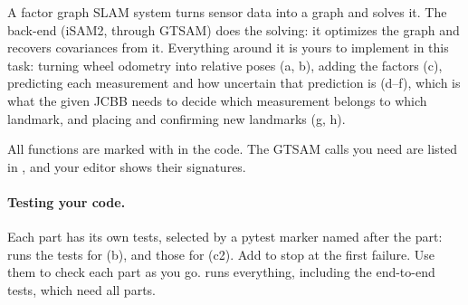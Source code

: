 \label{q:task01}
A factor graph SLAM system turns sensor data into a graph and solves it. The back-end (iSAM2, through GTSAM) does the solving: it optimizes the graph and recovers covariances from it. Everything around it is yours to implement in this task: turning wheel odometry into relative poses (a, b), adding the factors (c), predicting each measurement and how uncertain that prediction is (d--f), which is what the given JCBB needs to decide which measurement belongs to which landmark, and placing and confirming new landmarks (g, h).

All functions are marked with  in the code. The GTSAM calls you need are listed in , and your editor shows their signatures.

\paragraph{Testing your code.}
Each part has its own tests, selected by a pytest marker named after the part:  runs the tests for (b), and  those for (c2). Add  to stop at the first failure. Use them to check each part as you go.  runs everything, including the end-to-end tests, which need all parts.

